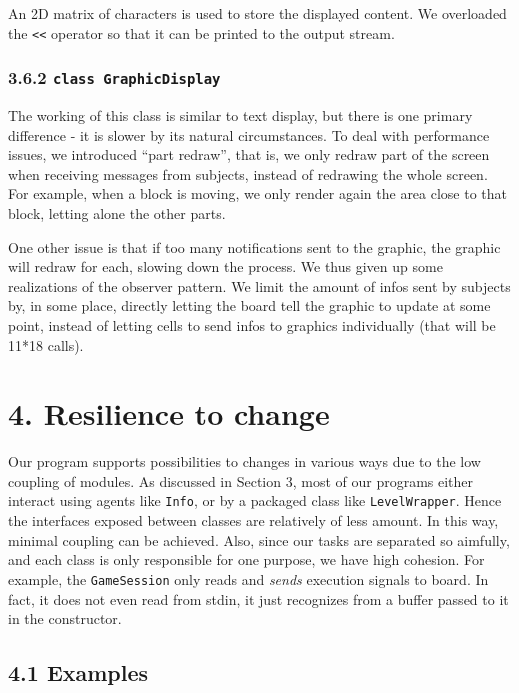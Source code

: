 \documentclass[
]{article}
\begin{document}
An 2D matrix of characters is used to store the displayed content. We
overloaded the \texttt{\textless{}\textless{}} operator so that it can
be printed to the output stream.

\hypertarget{class-graphicdisplay}{%
\subsubsection{\texorpdfstring{3.6.2
\texttt{class\ GraphicDisplay}}{3.6.2 class GraphicDisplay}}\label{class-graphicdisplay}}

The working of this class is similar to text display, but there is one
primary difference - it is slower by its natural circumstances. To deal
with performance issues, we introduced ``part redraw'', that is, we only
redraw part of the screen when receiving messages from subjects, instead
of redrawing the whole screen. For example, when a block is moving, we
only render again the area close to that block, letting alone the other
parts.

One other issue is that if too many notifications sent to the graphic,
the graphic will redraw for each, slowing down the process. We thus
given up some realizations of the observer pattern. We limit the amount
of infos sent by subjects by, in some place, directly letting the board
tell the graphic to update at some point, instead of letting cells to
send infos to graphics individually (that will be 11*18 calls).

\hypertarget{resilience-to-change}{%
\section{4. Resilience to change}\label{resilience-to-change}}

Our program supports possibilities to changes in various ways due to the
low coupling of modules. As discussed in Section 3, most of our programs
either interact using agents like \texttt{Info}, or by a packaged class
like \texttt{LevelWrapper}. Hence the interfaces exposed between classes
are relatively of less amount. In this way, minimal coupling can be
achieved. Also, since our tasks are separated so aimfully, and each
class is only responsible for one purpose, we have high cohesion. For
example, the \texttt{GameSession} only reads and \emph{sends} execution
signals to board. In fact, it does not even read from stdin, it just
recognizes from a buffer passed to it in the constructor.

\hypertarget{examples}{%
\subsection{4.1 Examples}\label{examples}}
\end{document}
